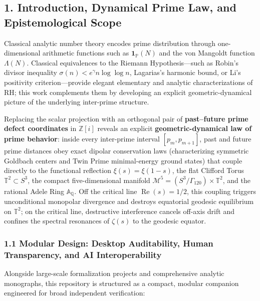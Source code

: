 \documentclass[
  11pt,
]{article}
\begin{document}
\subsection{1. Introduction, Dynamical Prime Law, and Epistemological
Scope}\label{introduction-dynamical-prime-law-and-epistemological-scope}

Classical analytic number theory encodes prime distribution through
one-dimensional arithmetic functions such as
\(\mathbf{1}_{\mathbb{P}}(N)\) and the von Mangoldt function
\(\Lambda(N)\). Classical equivalences to the Riemann Hypothesis---such
as Robin's divisor inequality \(\sigma(n) < e^\gamma n \log\log n\),
Lagarias's harmonic bound, or Li's positivity criterion---provide
elegant elementary and analytic characterizations of \(\mathrm{RH}\);
this work complements them by developing an explicit geometric-dynamical
picture of the underlying inter-prime structure.

Replacing the scalar projection with an orthogonal pair of
\textbf{past--future prime defect coordinates} in \(\mathbb{Z}[i]\)
reveals an explicit \textbf{geometric-dynamical law of prime behavior}:
inside every inter-prime interval \([p_m, p_{m+1}]\), past and future
prime distances obey exact dipolar conservation laws (characterizing
symmetric Goldbach centers and Twin Prime minimal-energy ground states)
that couple directly to the functional reflection \(\xi(s) = \xi(1-s)\),
the flat Clifford Torus \(\mathbb{T}^2 \subset S^3\), the compact
five-dimensional manifold
\(\mathcal{M}^5 = (S^3/\Gamma_{120}) \times \mathbb{T}^2\), and the
rational Adele Ring \(\mathbb{A}_\mathbb{Q}\). Off the critical line
\(\operatorname{Re}(s) = 1/2\), this coupling triggers unconditional
monopolar divergence and destroys equatorial geodesic equilibrium on
\(\mathbb{T}^2\); on the critical line, destructive interference cancels
off-axis drift and confines the spectral resonances of \(\zeta(s)\) to
the geodesic equator.

\subsubsection{1.1 Modular Design: Desktop Auditability, Human
Transparency, and AI
Interoperability}\label{modular-design-desktop-auditability-human-transparency-and-ai-interoperability}

Alongside large-scale formalization projects and comprehensive analytic
monographs, this repository is structured as a compact, modular
companion engineered for broad independent verification:
\end{document}
